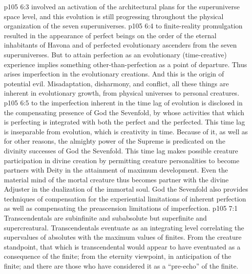\pc \vs p105 6:3 \bibnobreakspace {} involved an activation of the architectural plans for the superuniverse space level, and this evolution is still progressing throughout the physical organization of the seven superuniverses.
\pc \vs p105 6:4 \bibnobreakspace {} to finite\hyp{}reality promulgation resulted in the appearance of perfect beings on the order of the eternal inhabitants of Havona and of perfected evolutionary ascenders from the seven superuniverses. But to attain perfection as an evolutionary (time\hyp{}creative) experience implies something other\hyp{}than\hyp{}perfection as a point of departure. Thus arises imperfection in the evolutionary creations. And this is the origin of potential evil. Misadaptation, disharmony, and conflict, all these things are inherent in evolutionary growth, from physical universes to personal creatures.
\pc \vs p105 6:5 \bibnobreakspace {} to the imperfection inherent in the time lag of evolution is disclosed in the compensating presence of God the Sevenfold, by whose activities that which is perfecting is integrated with both the perfect and the perfected. This time lag is inseparable from evolution, which is creativity in time. Because of it, as well as for other reasons, the almighty power of the Supreme is predicated on the divinity successes of God the Sevenfold. This time lag makes possible creature participation in divine creation by permitting creature personalities to become partners with Deity in the attainment of maximum development. Even the material mind of the mortal creature thus becomes partner with the divine Adjuster in the dualization of the immortal soul. God the Sevenfold also provides techniques of compensation for the experiential limitations of inherent perfection as well as compensating the preascension limitations of imperfection.\plusone
{}
\vs p105 7:1 Transcendentals are subinfinite and subabsolute but superfinite and supercreatural. Transcendentals eventuate as an integrating level correlating the supervalues of absolutes with the maximum values of finites. From the creature standpoint, that which is transcendental would appear to have eventuated as a consequence of the finite; from the eternity viewpoint, in anticipation of the finite; and there are those who have considered it as a “pre\hyp{}echo” of the finite.
